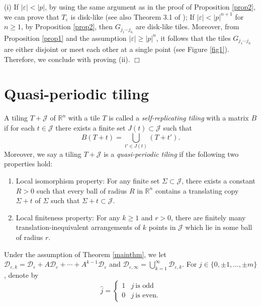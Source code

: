 \documentclass[12pt, reqno]{amsart}
\numberwithin{equation}{section}
\begin{document}
\bigskip

(i) If $|\varepsilon|<|p|$, by using the same argument as in the proof of Proposition \ref{prop2}, we can prove that $T_\varepsilon$ is disk-like (see also Theorem 3.1 of \cite{DeLa}); If $|\varepsilon|<|p|^{n+1}$ for $n \geq 1$, by Proposition \ref{prop2}, then $G_{j_1\cdots j_n}$ are disk-like tiles. Moreover, from Proposition \ref{prop1} and the assumption $|\varepsilon|\ge |p|^n$, it follows that the tiles $G_{j_1\cdots j_n}$ are either disjoint or meet each other at a single point (see Figure \ref{fig1}). Therefore, we conclude with proving (ii).
\hfill $\Box$




\section{\bf Quasi-periodic tiling}
A tiling $T+{\mathcal J}$ of ${\mathbb R}^n$ with a tile $T$  is called a {\it self-replicating tiling} with a matrix $B$ if for each $t\in {\mathcal J}$ there exists a finite set $J(t)\subset {\mathcal J}$ such that $$B(T+t)=\bigcup_{t'\in J(t)}(T+t').$$
Moreover, we say a tiling $T+{\mathcal J}$ is a {\it quasi-periodic tiling} if the following two properties hold:

\begin{enumerate}
\item  Local isomorphism property: For any finite set $\Sigma\subset {\mathcal J}$, there exists a constant $R>0$ such that every ball of radius $R$ in ${\mathbb R}^n$ contains a translating copy $\Sigma+t$ of $\Sigma$ such that $\Sigma+t\subset {\mathcal J}$.

\item Local finiteness property: For any $k\ge 1$ and $r>0$, there  are finitely many translation-inequivalent arrangements of $k$ points in $\mathcal J$ which lie in some ball of radius $r$.
\end{enumerate}


Under the assumption of Theorem \ref{mainthm}, we let ${\mathcal D}_{\varepsilon,k}={\mathcal D}_\varepsilon+ A{\mathcal D}_\varepsilon+\cdots+ A^{k-1}{\mathcal D}_\varepsilon$ and ${\mathcal D}_{\varepsilon,\infty}=\bigcup_{k=1}^\infty{\mathcal D}_{\varepsilon,k}$. For $j\in \{0,\pm1,\dots, \pm m\}$, denote by
\begin{equation*}
\widehat{j}=\left\{
\begin{array}{ll}
1 & j \ \text{is odd} \\
0 &  j \ \text{is even}.
\end{array} \right.
\end{equation*}
\end{document}
